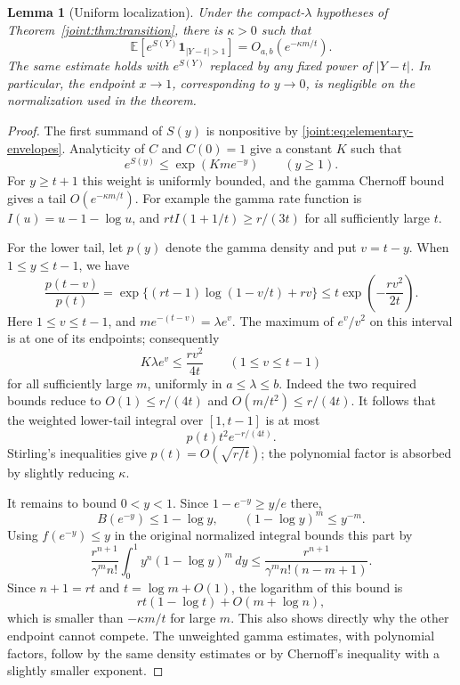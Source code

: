 \documentclass[11pt,a4paper]{article}
\numberwithin{equation}{section}
\theoremstyle{plain}
\newtheorem{lemma}[theorem]{Lemma}
\theoremstyle{definition}
\theoremstyle{remark}
\begin{document}
\begin{lemma}[Uniform localization]\label{joint:lem:localization}
Under the compact-$\lambda$ hypotheses of
Theorem~\ref{joint:thm:transition}, there is $\kappa>0$ such that
\begin{equation}\label{joint:eq:localization}
 \mathbb E\left[e^{S(Y)}\mathbf1_{|Y-t|>1}\right]
       =O_{a,b}\left(e^{-\kappa m/t}\right).
\end{equation}
The same estimate holds with $e^{S(Y)}$ replaced by any fixed power
of $|Y-t|$. In particular, the endpoint $x\to1$, corresponding to
$y\to0$, is negligible on the normalization used in the theorem.
\end{lemma}
\begin{proof}
The first summand of $S(y)$ is nonpositive by
\eqref{joint:eq:elementary-envelopes}. Analyticity of $C$ and $C(0)=1$
give a constant $K$ such that
\[
 e^{S(y)}\leq\exp(Kme^{-y})\qquad(y\geq1).
\]
For $y\geq t+1$ this weight is uniformly bounded, and the gamma
Chernoff bound gives a tail $O(e^{-\kappa m/t})$.
For example the gamma rate function is $I(u)=u-1-\log u$, and
$rt I(1+1/t)\geq r/(3t)$ for all sufficiently large $t$.

For the lower tail, let $p(y)$ denote the gamma density and put
$v=t-y$. When $1\leq y\leq t-1$, we have
\[
 \frac{p(t-v)}{p(t)}
  =\exp\{(rt-1)\log(1-v/t)+rv\}
  \leq t\exp\left(-\frac{rv^2}{2t}\right).
\]
Here $1\leq v\leq t-1$, and $me^{-(t-v)}=\lambda e^v$.
The maximum of $e^v/v^2$ on this interval is at one of its endpoints;
consequently
\[
 K\lambda e^v\leq\frac{rv^2}{4t}
 \qquad(1\leq v\leq t-1)
\]
for all sufficiently large $m$, uniformly in $a\leq\lambda\leq b$.
Indeed the two required bounds reduce to $O(1)\leq r/(4t)$ and
$O(m/t^2)\leq r/(4t)$. It follows that the weighted lower-tail
integral over $[1,t-1]$ is at most
\[
 p(t)t^2e^{-r/(4t)}.
\]
Stirling's inequalities give $p(t)=O(\sqrt{r/t})$; the polynomial
factor is absorbed by slightly reducing $\kappa$.

It remains to bound $0<y<1$. Since $1-e^{-y}\geq y/e$ there,
\[
 B(e^{-y})\leq1-\log y,
 \qquad (1-\log y)^m\leq y^{-m}.
\]
Using $f(e^{-y})\leq y$ in the original normalized integral bounds
this part by
\begin{equation}\label{joint:eq:opposite-endpoint}
 \frac{r^{n+1}}{\gamma^m n!}
 \int_0^1 y^n(1-\log y)^m\,dy
 \leq\frac{r^{n+1}}{\gamma^m n!(n-m+1)}.
\end{equation}
Since $n+1=rt$ and $t=\log m+O(1)$, the logarithm of this bound is
\[
 rt(1-\log t)+O(m+\log n),
\]
which is smaller than $-\kappa m/t$ for large $m$.
This also shows directly why the other endpoint cannot compete.
The unweighted gamma estimates, with polynomial factors, follow by
the same density estimates or by Chernoff's inequality with a
slightly smaller exponent.
\end{proof}
\end{document}
